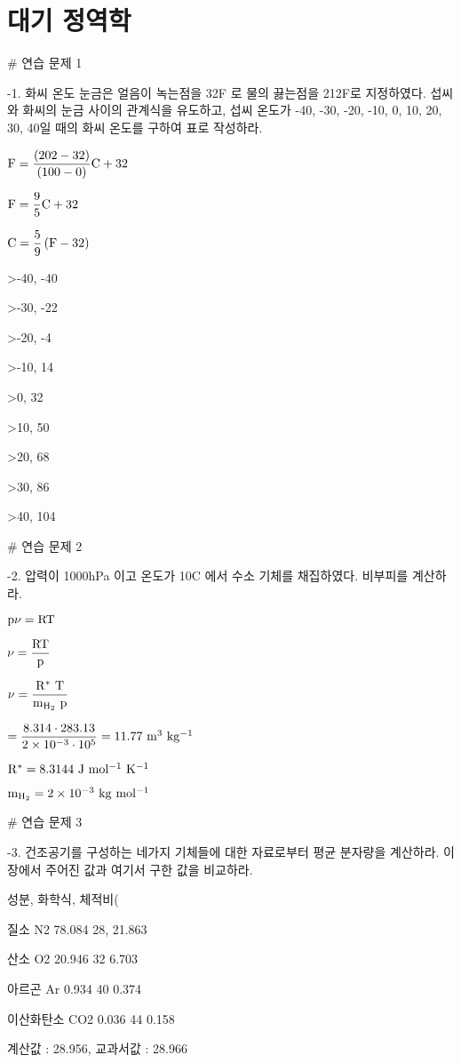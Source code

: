\section{대기 정역학 }

# 연습 문제 1

-1. 화씨 온도 눈금은 얼음이 녹는점을 32F 로 물의 끓는점을 212F로 지정하였다. 섭씨와 화씨의 눈금 사이의 관계식을 유도하고, 섭씨 온도가 -40, -30, -20,  -10, 0, 10, 20, 30, 40일 때의 화씨 온도를 구하여 표로 작성하라.

$ \rm F = \dfrac{(202-32)}{(100-0)} C + 32 $

$ \rm F = \dfrac{9}{5} C + 32$

$ \rm C = \dfrac{5}{9} \left( F - 32 \right)$

>-40,	-40

>-30,	-22

>-20,	-4

>-10,	14

>0,	32

>10,	50

>20,	68

>30,	86

>40,	104



# 연습 문제 2


-2. 압력이 1000hPa 이고 온도가 10C 에서 수소 기체를 채집하였다. 비부피를 계산하라.

$ \rm p  \nu = R T $

$ \rm \nu = \dfrac{R T}{p} $

$ \rm \nu = \dfrac{R^{*} ~T}{m_{H_{2}}~p} $

$ \rm = \dfrac{8.314 \cdot 283.13}{2 \times 10^{-3} \cdot 10^{5}} = 11.77 ~ m^{3}~kg^{-1} $

$ \rm R^{*} = 8.3144 ~J ~mol^{-1} ~K^{-1}$

$ \rm m_{H_{2}} = 2 \times 10^{-3} ~kg~mol^{-1} $




# 연습 문제 3


-3. 건조공기를 구성하는 네가지 기체들에 대한 자료로부터 평균 분자량을 계산하라. 이 장에서 주어진 값과 여기서 구한 값을 비교하라.

성분, 화학식, 체적비(%

질소	N2	78.084 28, 21.863

산소	O2	20.946	32 6.703

아르곤	Ar	0.934	40 0.374

이산화탄소	CO2	0.036	44 0.158

계산값 : 28.956, 교과서값 : 28.966


